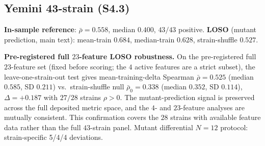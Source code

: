 \documentclass[11pt]{article}
\begin{document}
\subsection{Yemini 43-strain (S4.3)}
\textbf{In-sample reference}: $\bar\rho{=}0.558$, median $0.400$, $43/43$ positive. \textbf{LOSO} (mutant prediction, main text): mean-train $0.684$, median-train $0.628$, strain-shuffle $0.527$.

\textbf{Pre-registered full $23$-feature LOSO robustness.} On the pre-registered full $23$-feature set (fixed before scoring; the $4$ active features are a strict subset), the leave-one-strain-out test gives mean-training-delta Spearman $\bar\rho{=}0.525$ (median $0.585$, SD $0.211$) vs.\ strain-shuffle null $\bar\rho_0{=}0.338$ (median $0.352$, SD $0.114$), $\Delta{=}{+}0.187$ with $27/28$ strains $\rho{>}0$. The mutant-prediction signal is preserved across the full deposited metric space, and the $4$- and $23$-feature analyses are mutually consistent. This confirmation covers the $28$ strains with available feature data rather than the full $43$-strain panel. Mutant differential $N{=}12$ protocol: strain-specific 5/4/4 deviations.
\end{document}
